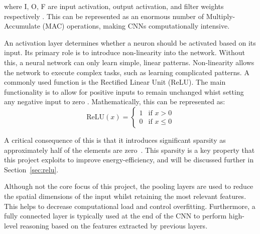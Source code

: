 \documentclass[12pt, a4paper, ukenglish]{article}
\begin{document}
    where I, O, F are input activation, output activation, and filter weights respectively \cite{choi_enabling_2023}. This can be represented as an enormous number of Multiply-Accumulate (MAC) operations, making CNNs computationally intensive. 

    An activation layer determines whether a neuron should be activated based on its input. Its primary role is to introduce non-linearity into the network. Without this, a neural network can only learn simple, linear patterns. Non-linearity allows the network to execute complex tasks, such as learning complicated patterns. A commonly used function is the Rectified Linear Unit (ReLU). The main functionality is to allow for positive inputs to remain unchanged whist setting any negative input to zero \cite{parashar_scnn_2017}. Mathematically, this can be represented as:
    \[
    \text{ReLU}(x) = 
    \begin{cases} 
        1 & \text{if } x > 0 \\ 
        0 & \text{if } x \le 0 
    \end{cases}
    \]



    A critical consequence of this is that it introduces significant sparsity as approximately half of the elements are zero~\cite{sun_sense_2023}. This sparsity is a key property that this project exploits to improve energy-efficiency, and will be discussed further in Section~\ref{sec:relu}.

    Although not the core focus of this project, the pooling layers are used to reduce the spatial dimensions of the input whilst retaining the most relevant features. This helps to decrease computational load and control overfitting. Furthermore, a fully connected layer is typically used at the end of the CNN to perform high-level reasoning based on the features extracted by previous layers\cite{cain_convolution_2021}.
\end{document}
